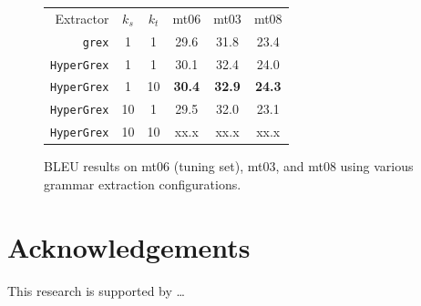 \documentclass[nofonts]{pbml} %
\begin{document}
\begin{figure}[ht!]
\centering
\begin{tabular}{r c c c c c}
Extractor & $k_s$ & $k_t$ & mt06 & mt03 & mt08 \\
\texttt{grex}      &  1 &  1 & 29.6 & 31.8 & 23.4 \\
\texttt{HyperGrex} &  1 &  1 & 30.1 & 32.4 & 24.0 \\
\texttt{HyperGrex} &  1 & 10 & \textbf{30.4} & \textbf{32.9} & \textbf{24.3} \\
\texttt{HyperGrex} & 10 &  1 & 29.5 & 32.0 & 23.1 \\
\texttt{HyperGrex} & 10 & 10 & xx.x & xx.x & xx.x \\
\end{tabular}
\caption{\textsc{BLEU} results on mt06 (tuning set), mt03, and mt08 using various grammar extraction configurations.}
\label{bleuresults}
\end{figure}

\section*{Acknowledgements}
This research is supported by \ldots



\correspondingaddress
\end{document}
